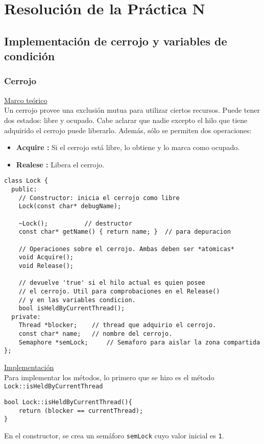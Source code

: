 \chapter{Resolución de la Práctica N}
\section{Implementación de cerrojo y variables de condición}
\subsection*{Cerrojo}
\textsf{\underline{Marco teórico}}\\
Un cerrojo provee una exclusión mutua para utilizar ciertos recursos. Puede tener dos estados: libre y ocupado. Cabe aclarar que nadie excepto el hilo que tiene adquirido el cerrojo puede liberarlo. Además, sólo se permiten dos operaciones:
\begin{itemize}
	\item \textbf{Acquire :} Si el cerrojo está libre, lo obtiene y lo marca como ocupado.
	\item \textbf{Realese :} Libera el cerrojo.
\end{itemize}
\begin{lstlisting}[style=C]
class Lock {
  public:
	// Constructor: inicia el cerrojo como libre
  	Lock(const char* debugName);

  	~Lock();          // destructor
  	const char* getName() { return name; }	// para depuracion

  	// Operaciones sobre el cerrojo. Ambas deben ser *atomicas*
  	void Acquire(); 
  	void Release();

  	// devuelve 'true' si el hilo actual es quien posee
  	// el cerrojo. Util para comprobaciones en el Release()
  	// y en las variables condicion.
  	bool isHeldByCurrentThread();
  private:
    Thread *blocker; 	// thread que adquirio el cerrojo.
    const char* name;	// nombre del cerrojo.
    Semaphore *semLock;     // Semaforo para aislar la zona compartida
};
\end{lstlisting}
\textsf{\underline{Implementación}}\\
Para implementar los métodos, lo primero que se hizo es el método \texttt{Lock::isHeldByCurrentThread}
\begin{lstlisting}[style=C]
bool Lock::isHeldByCurrentThread(){
    return (blocker == currentThread);
}
\end{lstlisting}
En el constructor, se crea un semáforo \texttt{semLock} cuyo valor inicial es \texttt{1}.\\

